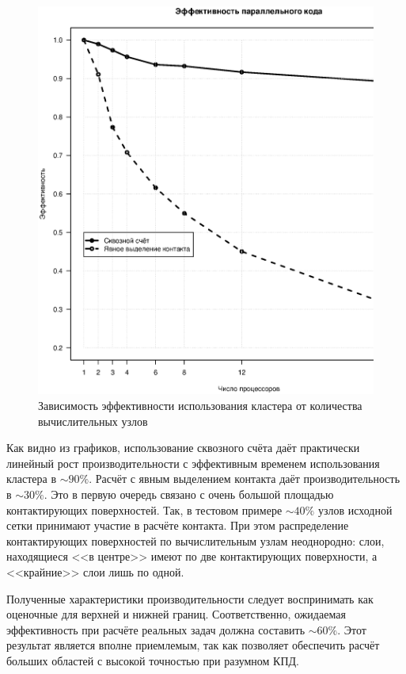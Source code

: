 \begin{figure}[htp]
\centering
\includegraphics[width=\textwidth]{eps/gcm3d-efficiency.eps}
\caption{Зависимость эффективности использования кластера от количества вычислительных узлов}
\label{pic:gcm_efficiency}
\end{figure}

Как видно из графиков, использование сквозного счёта даёт практически линейный
рост производительности с эффективным временем использования кластера в $\sim
90\%$.
Расчёт с явным выделением контакта даёт производительность в $\sim30\%$. Это  в
первую очередь связано с очень большой площадью контактирующих поверхностей. Так, в тестовом
примере $\sim 40\%$ узлов исходной сетки принимают участие в расчёте контакта.
При этом распределение контактирующих поверхностей по вычислительным узлам
неоднородно: слои, находящиеся <<в центре>> имеют по две контактирующих
поверхности, а <<крайние>> слои лишь по одной.

Полученные характеристики производительности следует воспринимать как оценочные
для верхней и нижней границ. Соответственно, ожидаемая эффективность при расчёте
реальных задач должна составить $\sim 60\%$. Этот результат является вполне
приемлемым, так как позволяет обеспечить расчёт больших областей с высокой
точностью при разумном КПД.
